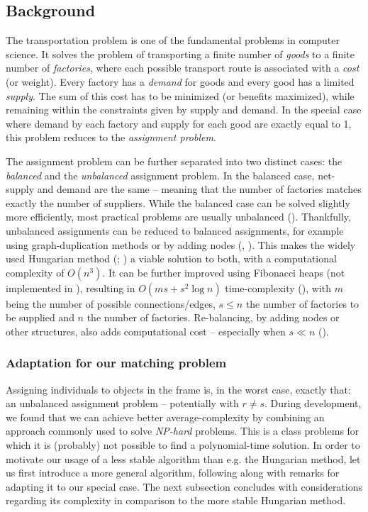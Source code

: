 \documentclass[9pt,lineno]{elife}
\newcommand{\TRex}{\protect\path{TRex}}
\begin{document}
\begin{appendixbox}
\subsection{Background}
The transportation problem is one of the fundamental problems in computer science. It solves the problem of transporting a finite number of \textit{goods} to a finite number of \textit{factories}, where each possible transport route is associated with a \textit{cost} (or weight). Every factory has a \textit{demand} for goods and every good has a limited \textit{supply}. The sum of this cost has to be minimized (or benefits maximized), while remaining within the constraints given by supply and demand. In the special case where demand by each factory and supply for each good are exactly equal to 1, this problem reduces to the \textit{assignment problem}.

The assignment problem can be further separated into two distinct cases: the \textit{balanced} and the \textit{unbalanced} assignment problem. In the balanced case, net-supply and demand are the same -- meaning that the number of factories matches exactly the number of suppliers. While the balanced case can be solved slightly more efficiently, most practical problems are usually unbalanced (\cite{ramshaw2012minimum}). Thankfully, unbalanced assignments can be reduced to balanced assignments, for example using graph-duplication methods or by adding nodes (\cite{ramshaw2012minimum},  \cite{ramshaw2012weight}). This makes the widely used Hungarian method (\cite{kuhn1955hungarian}; \cite{munkres1957algorithms}) a viable solution to both, with a computational complexity of $O(n^3)$. It can be further improved using Fibonacci heaps (not implemented in \TRex{}), resulting in $O(ms+s^2\log n)$ time-complexity (\cite{fredman1987fibonacci}), with $m$ being the number of possible connections/edges, $s\leq n$ the number of factories to be supplied and $n$ the number of factories. Re-balancing, by adding nodes or other structures, also adds computational cost -- especially when $s \ll n$ (\cite{ramshaw2012weight}).

\subsubsection{Adaptation for our matching problem}

Assigning individuals to objects in the frame is, in the worst case, exactly that: an unbalanced assignment problem -- potentially with $r\not=s$. During development, we found that we can achieve better average-complexity by combining an approach commonly used to solve \textit{NP-hard} problems. This is a class problems for which it is (probably) not possible to find a polynomial-time solution. In order to motivate our usage of a less stable algorithm than e.g. the Hungarian method, let us first introduce a more general algorithm, following along with remarks for adapting it to our special case. The next subsection concludes with considerations regarding its complexity in comparison to the more stable Hungarian method.


\end{appendixbox}
\end{document}
